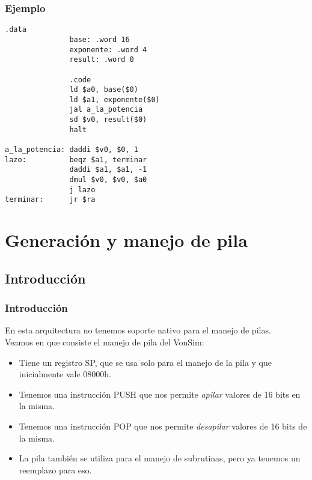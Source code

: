 \documentclass{beamer}
\begin{document}
\begin{frame}[fragile]
\frametitle{Ejemplo}
\tiny{
\begin{block}{}
\begin{lstlisting}[basicstyle=\ttfamily,keywordstyle=\color{blue}]
               .data
               base: .word 16
               exponente: .word 4
               result: .word 0

               .code
               ld $a0, base($0)
               ld $a1, exponente($0)
               jal a_la_potencia
               sd $v0, result($0)
               halt

a_la_potencia: daddi $v0, $0, 1
lazo:          beqz $a1, terminar
               daddi $a1, $a1, -1
               dmul $v0, $v0, $a0
               j lazo
terminar:      jr $ra
\end{lstlisting}
\end{block}
}
\end{frame}


\section{Generación y manejo de pila}
\subsection{Introducción}
\begin{frame}
\frametitle{Introducción}
En esta arquitectura no tenemos soporte nativo para el manejo de pilas. \\
Veamos en que consiste el manejo de pila del VonSim:
\begin{itemize}
\item Tiene un registro SP, que se usa solo para el manejo de la pila y que inicialmente vale 08000h.
\item Tenemos una instrucción PUSH que nos permite \emph{apilar} valores de 16 bits en la misma.
\item Tenemos una instrucción POP que nos permite \emph{desapilar} valores de 16 bits de la misma.
\item La pila también se utiliza para el manejo de subrutinas, pero ya tenemos un reemplazo para eso.
\end{itemize}
\end{frame}
\end{document}

